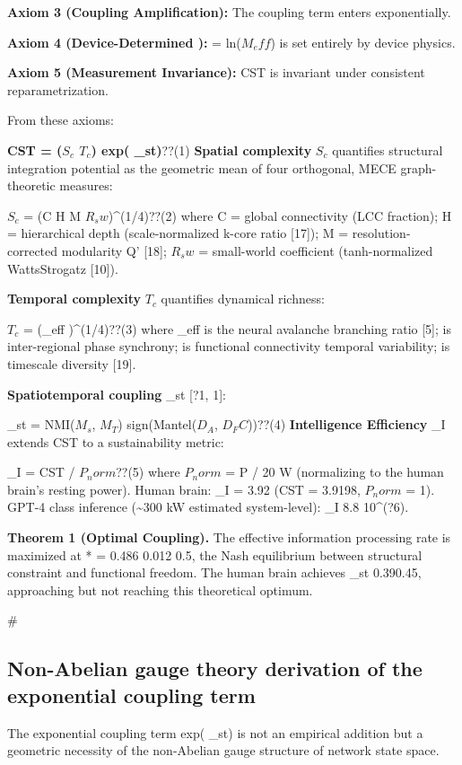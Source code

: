 \documentclass[a4paper,12pt]{article}
\begin{document}
\textbf{Axiom 3 (Coupling Amplification):} The coupling term enters exponentially.

\textbf{Axiom 4 (Device-Determined ):}  = ln($M_eff$) is set entirely by device physics.

\textbf{Axiom 5 (Measurement Invariance):} CST is invariant under consistent reparametrization.


From these axioms:


\textbf{CST = ($S_c$  $T_c$)  exp(  _st)}??(1)
\textbf{Spatial complexity} $S_c$ quantifies structural integration potential as the geometric mean of four orthogonal, MECE graph-theoretic measures:


$S_c$ = (C  H  M  $R_sw$)^(1/4)??(2)
where C = global connectivity (LCC fraction); H = hierarchical depth (scale-normalized k-core ratio [17]); M = resolution-corrected modularity Q' [18]; $R_sw$ = small-world coefficient (tanh-normalized WattsStrogatz  [10]).


\textbf{Temporal complexity} $T_c$ quantifies dynamical richness:


$T_c$ = (_eff      )^(1/4)??(3)
where _eff is the neural avalanche branching ratio [5];  is inter-regional phase synchrony;  is functional connectivity temporal variability;  is timescale diversity [19].


\textbf{Spatiotemporal coupling} _st  [?1, 1]:


_st = NMI($M_s$, $M_T$)  sign(Mantel($D_A$, $D_FC$))??(4)
\textbf{Intelligence Efficiency} _I extends CST to a sustainability metric:


_I = CST / $P_norm$??(5)
where $P_norm$ = P / 20 W (normalizing to the human brain's resting power). Human brain: _I = 3.92 (CST = 3.9198, $P_norm$ = 1). GPT-4 class inference (\textasciitilde{}300 kW estimated system-level): _I  8.8  10^(?6).


\textbf{Theorem 1 (Optimal Coupling).} The effective information processing rate is maximized at * = 0.486  0.012  0.5, the Nash equilibrium between structural constraint and functional freedom. The human brain achieves _st  0.390.45, approaching but not reaching this theoretical optimum.


\#\subsection{Non-Abelian gauge theory derivation of the exponential coupling term}


The exponential coupling term exp(  _st) is not an empirical addition but a geometric necessity of the non-Abelian gauge structure of network state space.
\end{document}
